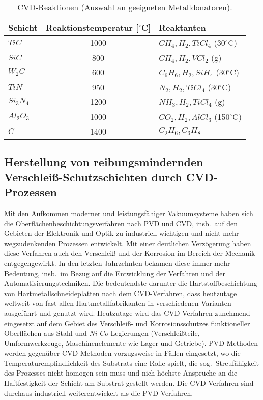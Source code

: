 \documentclass[12pt,a4paper,bibliography=totocnumbered,listof=totocnumbered,fleqn]{scrartcl}
\begin{document}
\begin{table}[h]
\centering
\begin{tabular}{lcl}
  \hline
	Schicht	\quad &	Reaktionstemperatur [$^\circ$C]	& Reaktanten \\	
  \hline \hline
	$TiC$	\quad &	1000	&$CH_{4}, H_{2}, TiCl_{4}$ (30$^\circ$C)\\
	$SiC$	\quad &	800 	&$CH_{4}, H_{2}, VCl_{2}$ (g)\\
	$W_{2}C$\quad &	600 	&$C_{6}H_{6}, H_{2}, SiH_{4}$ (30$^\circ$C)\\
	$TiN$	\quad &	950		&$N_{2}, H_{2}, TiCl_{4}$ (30$^\circ$C)\\
	$Si_{3}N_{4}$\quad &1200	&$NH_{3}, H_{2}, TiCl_{4}$ (g)\\
	$Al_{2}O_{3}$\quad &1000	&$CO_{2}, H_{2}, AlCl_{3}$ (150$^\circ$C)\\
	$C$		\quad &	1400	&$C_{2}H_{6}, C_{3}H_{8}$\\
	\hline
\end{tabular}
\caption{CVD-Reaktionen (Auswahl an geeigneten Metalldonatoren).}
\label{tab:cvdreaktionen}
\end{table}

\subsection{Herstellung von reibungsmindernden Verschleiß-Schutzschichten durch CVD-Prozessen}

Mit den Aufkommen moderner und leistungsfähiger Vakuumsysteme haben sich die Oberflächenbeschichtungsverfahren nach PVD und CVD, insb.\ auf den Gebieten der Elektronik und Optik zu industriell wichtigen und nicht mehr wegzudenkenden Prozessen entwickelt. Mit einer deutlichen Verzögerung haben diese Verfahren auch den Verschleiß und der Korrosion im Bereich der Mechanik entgegengewirkt. In den letzten Jahrzehnten bekamen diese immer mehr Bedeutung, insb.\ im Bezug auf die Entwicklung der Verfahren und der Automatisierungstechniken. Die bedeutendste darunter die Hartstoffbeschichtung von Hartmetallschneideplatten nach dem CVD-Verfahren, dass heutzutage weltweit von fast allen Hartmetallfabrikanten in verschiedenen Varianten ausgeführt und genutzt wird. Heutzutage wird das CVD-Verfahren zunehmend eingesetzt auf dem Gebiet des Verschleiß- und Korrosionsschutzes funktioneller Oberflächen aus Stahl und $Ni$-$Co$-Legierungen (Verschleißteile, Umformwerkzeuge, Maschinenelemente wie Lager und Getriebe).
PVD-Methoden werden gegenüber CVD-Methoden vorzugsweise in Fällen eingesetzt, wo die Temperaturempfindlichkeit des Substrats eine Rolle spielt, die sog.\ Streufähigkeit des Prozesses nicht homogen sein muss und nich höchste Ansprüche an die Haftfestigkeit der Schicht am Substrat gestellt werden. Die CVD-Verfahren sind durchaus industriell weiterentwickelt als die PVD-Verfahren. 
\end{document}
